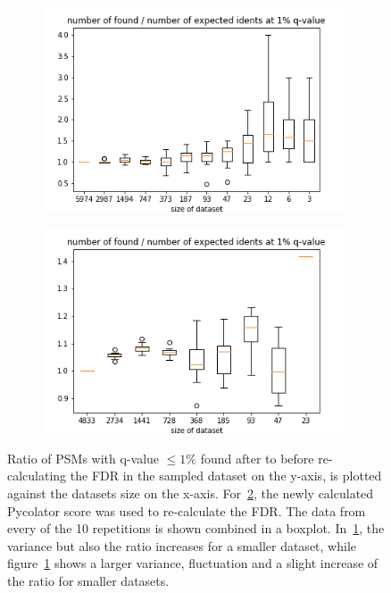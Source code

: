 \begin{figure}
	\normalsize
	\centering
	\begin{subfigure}{0.49 \textwidth}
		\includegraphics[width = \textwidth]{figures/found_vs_expected_dxl.png}
		\caption{}
		\label{fig:results:small_dataset_snd_found_dxl}
	\end{subfigure}
	\hfill
	\begin{subfigure}{0.49 \textwidth}
		\includegraphics[width = \textwidth]{figures/found_vs_expected_pxl.png}
		\caption{}
		\label{fig:results:small_dataset_snd_found_pxl}
	\end{subfigure}
	\caption[Found vs expected number of high confidence PSMs]{Ratio of PSMs with q-value $\leq1\%$ found after to before re-calculating the FDR in the sampled dataset on the y-axis, is plotted against the datasets size on the x-axis. For~\ref{fig:results:small_dataset_snd_found_pxl}, the newly calculated Pycolator score was used to re-calculate the FDR. The data from every of the 10 repetitions is shown combined in a boxplot. In~\ref{fig:results:small_dataset_snd_found_dxl}, the variance but also the ratio increases for a smaller dataset, while figure~\ref{fig:results:small_dataset_snd_found_dxl} shows a larger variance, fluctuation and a slight increase of the ratio for smaller datasets.}
	\label{fig:results:small_dataset_snd_found}
\end{figure}
